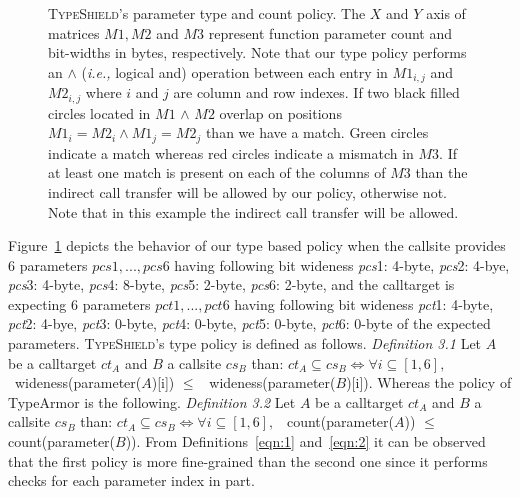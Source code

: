 \begin{figure}[H]
{\begin{tikzpicture}[shorten >=1pt,node distance=2cm,on grid,auto]
\end{tikzpicture}}
\caption{\textsc{TypeShield}'s parameter type and count policy.
The $X$ and $Y$ axis of matrices $M1, M2$ and $M3$ represent function parameter count 
and bit-widths in bytes, respectively.
Note that our type policy performs an $\wedge$ (\textit{i.e.,} logical and) operation
between each entry in $M1_{i,j}$ and $M2_{i,j}$ where $i$ and $j$ are column and row indexes. 
If two black filled circles located in $M1$ $\wedge$ $M2$ overlap on positions $M1_{i} = M2_{i} \wedge M1_{j} = M2_{j}$ than we have a match.
Green circles indicate a match whereas red circles indicate a mismatch in $M3$.
If at least one match is present on each of the columns of 
$M3$ than the indirect call transfer will be allowed by our policy, 
otherwise not. Note that in this example
the indirect call transfer will be allowed.} 
\label{Type and parameter count policy.}
\end{figure}

Figure~\ref{Type and parameter count policy.} depicts
the behavior of our type based policy
when the callsite provides 6 parameters $pcs1, ..., pcs6$ having following bit 
wideness \textit{pcs}1: 4-byte, \textit{pcs}2: 4-bye, \textit{pcs}3: 4-byte, \textit{pcs}4: 8-byte, \textit{pcs}5: 2-byte, 
\textit{pcs}6: 2-byte, and the calltarget is expecting 6 parameters $pct1, ..., pct6$ having following bit 
wideness \textit{pct}1: 4-byte, \textit{pct}2: 4-bye, \textit{pct}3: 0-byte, \textit{pct}4: 0-byte, \textit{pct}5: 0-byte, 
\textit{pct}6: 0-byte of the expected parameters. 
\textsc{TypeShield}'s type policy is defined as follows. 
\label{eqn:1}{
\textit{Definition 3.1} Let $A$ be a calltarget $ct_{A}$ and $B$ a callsite $cs_{B}$ than: 
$ct_{A} \subseteq cs_{B} \iff \forall i \subseteq [1, 6],$
\ wideness(parameter($A$)[i]) $\leq$ \ wideness(parameter($B$)[i]).
}
Whereas the policy of TypeArmor is the following. 
\label{eqn:2}{
\textit{Definition 3.2} Let $A$ be a calltarget $ct_{A}$ and $B$ a callsite $cs_{B}$ than: 
$ct_{A} \subseteq cs_{B} \iff \forall i \subseteq [1, 6],$ 
\ count(parameter($A$)) $\leq$ count(parameter($B$)).
}
From Definitions~\eqref{eqn:1} and~\eqref{eqn:2} it can be observed that 
the first policy is more fine-grained than the second one since it performs checks 
for each parameter index in part.

